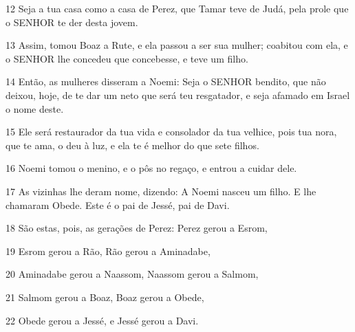\par 12 Seja a tua casa como a casa de Perez, que Tamar teve de Judá, pela prole que o SENHOR te der desta jovem.
\par 13 Assim, tomou Boaz a Rute, e ela passou a ser sua mulher; coabitou com ela, e o SENHOR lhe concedeu que concebesse, e teve um filho.
\par 14 Então, as mulheres disseram a Noemi: Seja o SENHOR bendito, que não deixou, hoje, de te dar um neto que será teu resgatador, e seja afamado em Israel o nome deste.
\par 15 Ele será restaurador da tua vida e consolador da tua velhice, pois tua nora, que te ama, o deu à luz, e ela te é melhor do que sete filhos.
\par 16 Noemi tomou o menino, e o pôs no regaço, e entrou a cuidar dele.
\par 17 As vizinhas lhe deram nome, dizendo: A Noemi nasceu um filho. E lhe chamaram Obede. Este é o pai de Jessé, pai de Davi.
\par 18 São estas, pois, as gerações de Perez: Perez gerou a Esrom,
\par 19 Esrom gerou a Rão, Rão gerou a Aminadabe,
\par 20 Aminadabe gerou a Naassom, Naassom gerou a Salmom,
\par 21 Salmom gerou a Boaz, Boaz gerou a Obede,
\par 22 Obede gerou a Jessé, e Jessé gerou a Davi.


